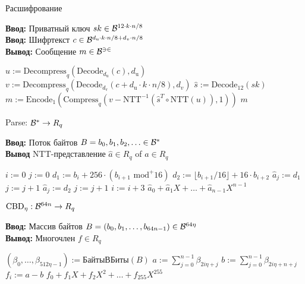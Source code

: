\begin{algorithm}[H]
\caption{Расшифрование}
\textbf{Ввод:}  Приватный ключ $sk \in {\cal B}^{12 \cdot k \cdot n/8}$\\
\textbf{Ввод:} Шифртекст  $c \in {\cal B}^{d_{\text{u}} \cdot k \cdot n/8 + d_{v} \cdot n/8}$ \\
\textbf{Вывод:} Сообщение  $m \in \cal{B}^{32}$ 
\begin{algorithmic}[1]
\State \( u := \text{Decompress}_q(\text{Decode}_{d_{\text{u}}}(c), d_{\text{u}}) \)
\State \( v := \text{Decompress}_q(\text{Decode}_{d_{\text{v}}}(c + d_{\text{u}} \cdot k \cdot n/8), d_{v}) \) 
\State \( \hat{s} := \text{Decode}_{12}(sk) \) 
\State \( m := \text{Encode}_{1}(\text{Compress}_q(v - \text{NTT}^{-1}(\hat{s}^T \circ \text{NTT}(u)), 1)) \) 
\State \Return \( m \)
\end{algorithmic}
\end{algorithm}

\begin{algorithm}[H]
\caption{Parse: ${\cal{B}}^* \rightarrow R_q$}
\textbf{Ввод:} Поток байтов \( B = b_0, b_1, b_2, \ldots \in \cal{B}^* \)\\
\textbf{Вывод} NTT-представление \( \hat{a} \in R_q \) of \( a \in R_q \)
\begin{algorithmic}[1]
\State \( i := 0 \)
\State \( j := 0 \)
    \State \( d_1 := b_i + 256 \cdot (b_{i+1} \text{ mod}^{+} 16) \)
    \State \( d_2 := \lfloor b_{i+1}/16 \rfloor + 16 \cdot b_{i+2} \)
        \State \( \hat{a}_j := d_1 \)
        \State \( j := j + 1 \)
    \EndIf
        \State \( \hat{a}_j := d_2 \)
        \State \( j := j + 1 \)
    \EndIf
    \State \( i := i + 3 \)
\EndWhile
\State \Return \( \hat{a}_0 + \hat{a}_1X + \ldots + \hat{a}_{n-1}X^{n-1} \)
\end{algorithmic}
\end{algorithm}

\begin{algorithm}[H]
\caption{$\text{CBD}_\eta: {\cal{B}}^{64n} \rightarrow R_q$}
\textbf{Ввод:} Массив байтов $B = (b_0, b_1, \ldots, b_{64n-1}) \in {\cal{B}}^{64\eta}$\\
\textbf{Вывод:} Многочлен \( f \in R_q \)
\begin{algorithmic}[1]
\State \( (\beta_0, \ldots, \beta_{512\eta-1}) := \text{БайтыВБиты}(B) \)
    \State \( a := \sum_{j=0}^{n-1} \beta_{2i\eta+j} \)
    \State \( b := \sum_{j=0}^{n-1} \beta_{2i\eta+n+j}\)
    \State \( f_i := a - b \)
\EndFor
\State \Return \( f_0 + f_1X + f_2X^2 + \ldots + f_{255}X^{255} \)
\end{algorithmic}
\end{algorithm}

